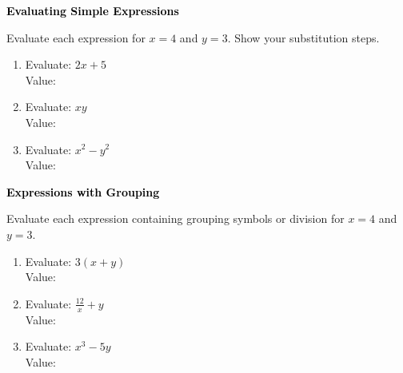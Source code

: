 \documentclass[12pt, letterpaper, fleqn]{article}
\newcommand{\blanklong}{\underline{\hspace{6.5cm}}}
\begin{document}
\begin{tcolorbox}[colback=black!10]
\large\textcolor{black}{\textbf{Evaluating Simple Expressions}}
\end{tcolorbox}

\noindent
Evaluate each expression for $x = 4$ and $y = 3$. Show your substitution steps.

\vspace{3mm}

\begin{enumerate}[itemsep=2.2cm, leftmargin=0.6cm]

\item Evaluate: $2x + 5$ \\
Value: \blanklong

\vspace{2cm}

\item Evaluate: $xy$ \\
Value: \blanklong

\vspace{2cm}

\item Evaluate: $x^2 - y^2$ \\
Value: \blanklong

\vspace{2cm}

\end{enumerate}

\newpage

\begin{tcolorbox}[colback=black!10]
\large\textcolor{black}{\textbf{Expressions with Grouping}}
\end{tcolorbox}

\noindent
Evaluate each expression containing grouping symbols or division for $x = 4$ and $y = 3$.

\vspace{3mm}

\begin{enumerate}[itemsep=2.2cm, leftmargin=0.6cm]

\item Evaluate: $3(x + y)$ \\
Value: \blanklong

\vspace{2cm}

\item Evaluate: $\frac{12}{x} + y$ \\
Value: \blanklong

\vspace{2cm}

\item Evaluate: $x^3 - 5y$ \\
Value: \blanklong

\vspace{2cm}

\end{enumerate}
\end{document}
